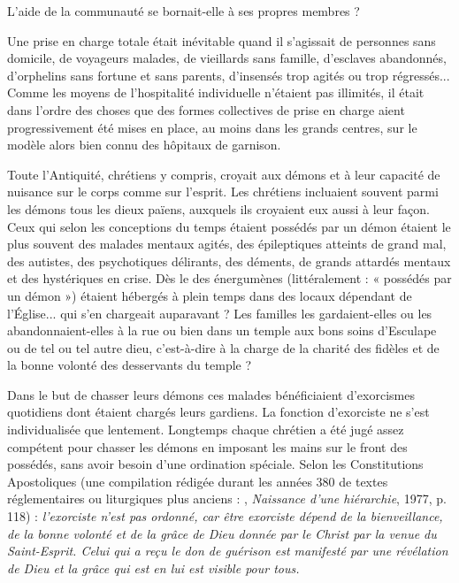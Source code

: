 L'aide de la communauté se bornait-elle à ses propres membres ? 

 Une prise en charge totale était inévitable quand il s'agissait de personnes sans domicile, de voyageurs malades, de vieillards sans famille, d'esclaves abandonnés, d'orphelins sans fortune et sans parents, d'insensés trop agités ou trop régressés... Comme les moyens de l'hospitalité individuelle n'étaient pas illimités, il était dans l'ordre des choses que des formes collectives de prise en charge aient progressivement été mises en place, au moins dans les grands centres, sur le modèle alors bien connu des hôpitaux de garnison. 



Toute l'Antiquité, chrétiens y compris, croyait aux démons et à leur capacité de nuisance sur le corps comme sur l'esprit. Les chrétiens incluaient souvent parmi les démons tous les dieux païens, auxquels ils croyaient eux aussi à leur façon. Ceux qui selon les conceptions du temps étaient possédés par un démon étaient le plus souvent des malades mentaux agités, des épileptiques atteints de grand mal, des autistes, des psychotiques délirants, des déments, de grands attardés mentaux et des hystériques en crise. Dès le  des énergumènes (littéralement : « possédés par un démon ») étaient hébergés à plein temps dans des locaux dépendant de l'Église... qui s'en chargeait auparavant ? Les familles les gardaient-elles ou les abandonnaient-elles à la rue ou bien dans un temple aux bons soins d'Esculape ou de tel ou tel autre dieu, c'est-à-dire à la charge de la charité des fidèles et de la bonne volonté des desservants du temple ?

 Dans le but de chasser leurs démons ces malades bénéficiaient d'exorcismes quotidiens dont étaient chargés leurs gardiens. La fonction d'exorciste ne s'est individualisée que lentement. Longtemps chaque chrétien a été jugé assez compétent pour chasser les démons en imposant les mains sur le front des possédés, sans avoir besoin d'une ordination spéciale. Selon les Constitutions Apostoliques (une compilation rédigée durant les années 380 de textes réglementaires ou liturgiques plus anciens : , \emph{Naissance d'une hiérarchie}, 1977, p. 118) : \emph{l'exorciste n'est pas ordonné, car être exorciste dépend de la bienveillance, de la bonne volonté et de la grâce de Dieu donnée par le Christ par la venue du Saint-Esprit. Celui qui a reçu le don de guérison est manifesté par une révélation de Dieu et la grâce qui est en lui est visible pour tous.}

